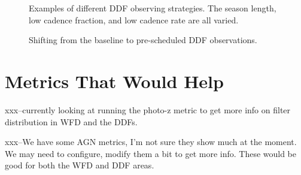 \begin{figure}
\caption{Examples of different DDF observing strategies. The season length, low cadence fraction, and low cadence rate are all varied. \label{fig:ddf_acourd}}
\end{figure}


\begin{figure}
\caption{Shifting from the baseline to pre-scheduled DDF observations.}
\end{figure}

\section{Metrics That Would Help}

xxx--currently looking at running the photo-z metric to get more info on filter distribution in WFD and the DDFs.

xxx--We have some AGN metrics, I'm not sure they show much at the moment. We may need to configure, modify them a bit to get more info. These would be good for both the WFD and DDF areas. 

